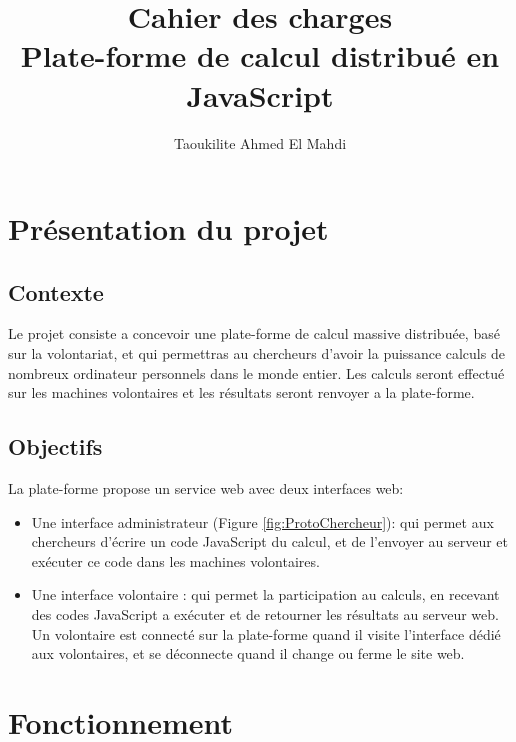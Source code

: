 \documentclass[a4paper]{article}
\title{Cahier des charges\\ Plate-forme de calcul distribué en JavaScript}
\author{Taoukilite Ahmed El Mahdi}
\begin{document}
\maketitle

\section{Présentation du projet}
\subsection{Contexte}
Le projet consiste a concevoir une plate-forme de calcul massive distribuée, basé sur la volontariat, et qui permettras au chercheurs d'avoir la puissance calculs de nombreux ordinateur personnels dans le monde entier. Les calculs seront effectué sur les machines volontaires et les résultats seront renvoyer a la plate-forme.

 


\subsection{Objectifs}
La plate-forme propose un service web avec deux interfaces web:
\begin{itemize}
\item Une interface administrateur (Figure \ref{fig:ProtoChercheur}): qui permet aux chercheurs d'écrire un code JavaScript du calcul, et de l'envoyer au serveur et exécuter ce code dans les machines volontaires.   
\item Une interface volontaire : qui permet la participation au calculs, en recevant des codes JavaScript a exécuter et de retourner les résultats au serveur web.
 Un volontaire est connecté sur la plate-forme quand il visite l'interface dédié aux volontaires, et se déconnecte quand il change ou ferme le site web. 

\end{itemize}


\section{Fonctionnement}
\end{document}
